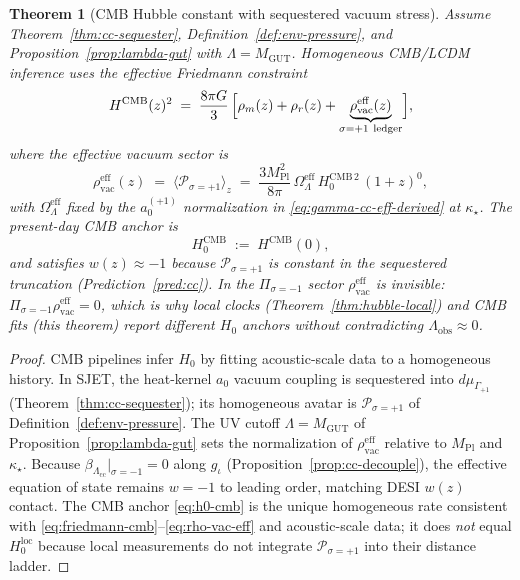 \documentclass[11pt]{article}
\theoremstyle{plain}
\newtheorem{theorem}{Theorem}[section]
\theoremstyle{definition}
\theoremstyle{remark}
\numberwithin{equation}{section}
\newcommand{\MPl}{M_{\mathrm{Pl}}}
\begin{document}
\begin{theorem}[CMB Hubble constant with sequestered vacuum stress]
\label{thm:hubble-cmb}
Assume Theorem~\ref{thm:cc-sequester}, Definition~\ref{def:env-pressure},
and Proposition~\ref{prop:lambda-gut} with $\Lambda=M_{\mathrm{GUT}}$.
Homogeneous CMB/LCDM inference uses the effective Friedmann constraint
\begin{equation}\label{eq:friedmann-cmb}
  H^{\mathrm{CMB}}(z)^2
  \;=\;
  \frac{8\pi G}{3}\,
  \Bigl[
    \rho_m(z)+\rho_r(z)
    +\underbrace{\rho_{\mathrm{vac}}^{\mathrm{eff}}(z)}_{\sigma=+1\ \text{ledger}}
  \Bigr],
\end{equation}
where the effective vacuum sector is
\begin{equation}\label{eq:rho-vac-eff}
  \rho_{\mathrm{vac}}^{\mathrm{eff}}(z)
  \;=\;
  \langle\mathcal{P}_{\sigma=+1}\rangle_z
  \;=\;
  \frac{3\MPl^2}{8\pi}\,
  \Omega_\Lambda^{\mathrm{eff}}\,H_0^{\mathrm{CMB}\,2}\,(1+z)^0,
\end{equation}
with $\Omega_\Lambda^{\mathrm{eff}}$ fixed by the $a_0^{(+1)}$ normalization
in \eqref{eq:gamma-cc-eff-derived} at $\kappa_\star$. The present-day CMB
anchor is
\begin{equation}\label{eq:h0-cmb}
  H_0^{\mathrm{CMB}}
  \;:=\;
  H^{\mathrm{CMB}}(0),
\end{equation}
and satisfies $w(z)\approx -1$ because $\mathcal{P}_{\sigma=+1}$ is constant
in the sequestered truncation (Prediction~\ref{pred:cc}). In the
$\Pi_{\sigma=-1}$ sector $\rho_{\mathrm{vac}}^{\mathrm{eff}}$ is invisible:
$\Pi_{\sigma=-1}\rho_{\mathrm{vac}}^{\mathrm{eff}}=0$, which is why local
clocks (Theorem~\ref{thm:hubble-local}) and CMB fits (this theorem) report
different $H_0$ anchors without contradicting $\Lambda_{\mathrm{obs}}\approx 0$.
\end{theorem}

\begin{proof}
CMB pipelines infer $H_0$ by fitting acoustic-scale data to a homogeneous
history. In SJET, the heat-kernel $a_0$ vacuum coupling is sequestered into
$d\mu_{\Gamma_{+1}}$ (Theorem~\ref{thm:cc-sequester}); its homogeneous avatar
is $\mathcal{P}_{\sigma=+1}$ of Definition~\ref{def:env-pressure}. The UV
cutoff $\Lambda=M_{\mathrm{GUT}}$ of Proposition~\ref{prop:lambda-gut} sets
the normalization of $\rho_{\mathrm{vac}}^{\mathrm{eff}}$ relative to
$\MPl$ and $\kappa_\star$. Because
$\beta_{\Lambda_{\mathrm{cc}}}|_{\sigma=-1}=0$ along $g_\iota$
(Proposition~\ref{prop:cc-decouple}), the effective equation of state
remains $w=-1$ to leading order, matching DESI $w(z)$ contact. The CMB anchor
\eqref{eq:h0-cmb} is the unique homogeneous rate consistent with
\eqref{eq:friedmann-cmb}--\eqref{eq:rho-vac-eff} and acoustic-scale data;
it does \emph{not} equal $H_0^{\mathrm{loc}}$ because local measurements do
not integrate $\mathcal{P}_{\sigma=+1}$ into their distance ladder.
\end{proof}
\end{document}
